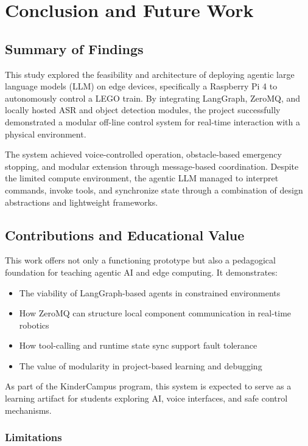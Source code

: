 \chapter{Conclusion and Future Work}
\label{ch:conclusion}

\section{Summary of Findings}

This study explored the feasibility and architecture of deploying agentic large language models (LLM) on edge devices, specifically a Raspberry Pi 4 to autonomously control a LEGO train. By integrating LangGraph, ZeroMQ, and locally hosted ASR and object detection modules, the project successfully demonstrated a modular off-line control system for real-time interaction with a physical environment.

The system achieved voice-controlled operation, obstacle-based emergency stopping, and modular extension through message-based coordination. Despite the limited compute environment, the agentic LLM managed to interpret commands, invoke tools, and synchronize state through a combination of design abstractions and lightweight frameworks.

\section{Contributions and Educational Value}

This work offers not only a functioning prototype but also a pedagogical foundation for teaching agentic AI and edge computing. It demonstrates:

\begin{itemize}
    \item The viability of LangGraph-based agents in constrained environments
    \item How ZeroMQ can structure local component communication in real-time robotics
    \item How tool-calling and runtime state sync support fault tolerance
    \item The value of modularity in project-based learning and debugging
\end{itemize}

As part of the KinderCampus program, this system is expected to serve as a learning artifact for students exploring AI, voice interfaces, and safe control mechanisms.

\subsection{Limitations}

